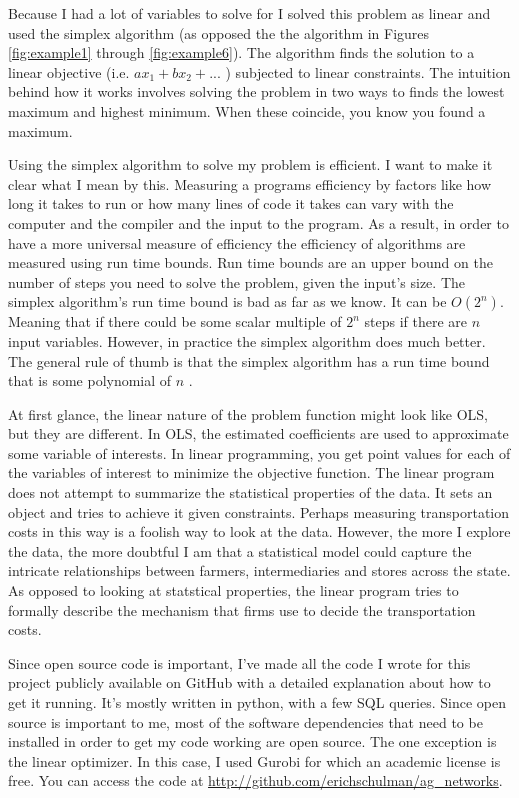 \documentclass{report}
\begin{document}
Because I had a lot of variables to solve for I solved this problem as linear and used the simplex algorithm (as opposed the the algorithm in Figures \ref{fig:example1} through \ref{fig:example6}). The algorithm finds the solution to a linear objective (i.e. $a x_1 +b x_2 + ...$ ) subjected to linear constraints. The intuition behind how it works involves solving the problem in two ways to finds the lowest maximum and highest minimum. When these coincide,  you know you found a maximum.

Using the simplex algorithm to solve my problem is efficient. I want to make it clear what I mean by this. Measuring a programs efficiency by factors like how long it takes to run or how many lines of code it takes can vary with the computer and the compiler and the input to the program. As a result, in order to have a more universal measure of efficiency the efficiency of algorithms are measured using run time bounds. Run time bounds are an upper bound on the number of steps you need to solve the problem, given the input's size.  The simplex algorithm's run time bound is bad as far as we know. It can be $O(2^n)$. Meaning that if there could be some scalar multiple of $2^n$ steps if there are $n$ input variables. However, in practice the simplex algorithm does much better. The general rule of thumb is that the simplex algorithm has a run time bound that is some polynomial of $n$ \cite{Cook}.

At first glance, the  linear nature of the problem function might look like OLS, but they are different. In OLS, the estimated coefficients are used to approximate some variable of interests. In linear programming, you get point values for each of the variables of interest to minimize the objective function. The linear program does not attempt to summarize the statistical properties of the data. It sets an object and tries to achieve it given constraints. Perhaps measuring transportation costs in this way is a foolish way to look at the data. However, the more I explore the data, the more doubtful I am that a statistical model could capture the intricate relationships between farmers, intermediaries and stores across the state. As opposed to looking at statstical properties, the linear program tries to formally describe the mechanism that firms use to decide the transportation costs.

Since  open source code is important, I've made all the code I wrote for this project publicly available on GitHub with a detailed explanation about how to get it running. It's mostly written in python, with a few SQL queries. Since open source is important to me, most of the software dependencies that need to be installed in order to get my code working are open source. The one exception is the linear optimizer. In this case, I used Gurobi for which an academic license is free. You can access the code at \url{http://github.com/erichschulman/ag_networks}.
\end{document}
